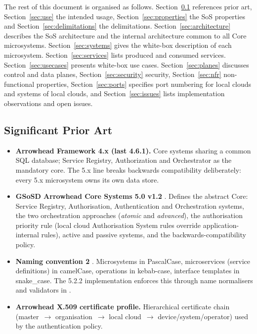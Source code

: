 \documentclass[a4paper]{arrowhead}
\begin{document}
The rest of this document is organised as follows. Section~\ref{sec:prior_art} references
prior art, Section~\ref{sec:use} the intended usage, Section~\ref{sec:properties} the SoS
properties and Section~\ref{sec:delimitations} the delimitations. Section~\ref{sec:architecture}
describes the SoS architecture and the internal architecture common to all Core microsystems.
Section~\ref{sec:systems} gives the white-box description of each microsystem.
Section~\ref{sec:services} lists produced and consumed services. Section~\ref{sec:usecases}
presents white-box use cases. Section~\ref{sec:planes} discusses control and data planes,
Section~\ref{sec:security} security, Section~\ref{sec:nfr} non-functional properties,
Section~\ref{sec:ports} specifies port numbering for local clouds and systems of local clouds,
and Section~\ref{sec:issues} lists implementation observations and open issues.

\newpage

\subsection{Significant Prior Art}
\label{sec:prior_art}

\begin{itemize}
  \item \textbf{Arrowhead Framework 4.x (last 4.6.1).} Core systems sharing a common SQL
        database; Service Registry, Authorization and Orchestrator as the mandatory core. The 5.x
        line breaks backwards compatibility deliberately: every 5.x microsystem owns its own data
        store.
  \item \textbf{GSoSD Arrowhead Core Systems 5.0 v1.2} \cite{gsosd50}. Defines the abstract
        Core: Service Registry, Authorisation, Authentication and Orchestration systems, the two
        orchestration approaches (\emph{atomic} and \emph{advanced}), the authorisation priority
        rule (local cloud Authorisation System rules override application-internal rules), active
        and passive systems, and the backwards-compatibility policy.
  \item \textbf{Naming convention 2} \cite{naming2}. Microsystems in PascalCase, microservices
        (service definitions) in camelCase, operations in kebab-case, interface templates in
        snake\_case. The 5.2.2 implementation enforces this through name normalisers and
        validators in .
  \item \textbf{Arrowhead X.509 certificate profile.} Hierarchical certificate chain
        (master~$\rightarrow$ organisation~$\rightarrow$ local cloud~$\rightarrow$
        device/system/operator) used by the  authentication policy.
\end{itemize}
\end{document}
